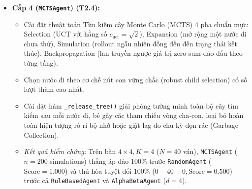 \documentclass[a4paper,12pt]{report}
\begin{document}
\begin{itemize}
\begin{itemize}
        \item Cài đặt cơ chế sắp xếp nước đi (Move Ordering) dựa trên nước đi tối ưu của độ sâu trước (Principal Variation - PV) và ma trận trọng số vị trí tĩnh.
        \item Hàm lượng giá Heuristic tĩnh \texttt{evaluate\_\allowbreak board} lượng giá toàn bộ các cửa sổ thắng mở, chấm điểm theo hàm mũ cơ số 10 và nén phi tuyến qua hàm $\tanh$ vào khoảng $(-1.0, 1.0)$.
        \item Tích hợp cơ chế Iterative Deepening kiểm soát deadline thời gian: kiểm tra đồng hồ mỗi 256 nút duyệt (\texttt{nodes\_\allowbreak visited \& 255 == 0}), chủ động ngắt qua ngoại lệ \texttt{SearchTimeoutError} và lập tức hoàn trả nước đi tốt nhất của độ sâu hoàn chỉnh gần nhất.
        \item \textit{Kết quả kiểm chứng:} Trên bàn $4 \times 4, K=4$ ở độ sâu $d=4$, kỹ thuật cắt tỉa Alpha-Beta kết hợp Move Ordering đã cắt giảm số lượng nút duyệt từ $47{,}297$ nút (Minimax thuần) xuống còn $1{,}941$ nút (giảm tới \textbf{95.9\%} số nút duyệt), độ trễ giảm từ $523.16\text{ ms}$ xuống còn $50.67\text{ ms}$ mà vẫn bảo toàn chính xác nước đi tối ưu và giá trị đánh giá gốc.
    \end{itemize}
    \item \textbf{Cấp 4 (\texttt{MCTSAgent}) (T2.4):}
    \begin{itemize}
        \item Cài đặt thuật toán Tìm kiếm cây Monte Carlo (MCTS) 4 pha chuẩn mực: Selection (UCT với hằng số $c_{\text{uct}} = \sqrt{2}$), Expansion (mở rộng một nước đi chưa thử), Simulation (rollout ngẫu nhiên đồng đều đến trạng thái kết thúc), Backpropagation (lan truyền ngược giá trị zero-sum đảo dấu theo từng tầng).
        \item Chọn nước đi theo cơ chế nút con vững chắc (robust child selection) có số lượt thăm cao nhất.
        \item Cài đặt hàm \texttt{\_release\_\allowbreak tree()} giải phóng tường minh toàn bộ cây tìm kiếm sau mỗi nước đi, bẻ gãy các tham chiếu vòng cha-con, loại bỏ hoàn toàn hiện tượng rò rỉ bộ nhớ hoặc giật lag do chu kỳ dọn rác (Garbage Collection).
        \item \textit{Kết quả kiểm chứng:} Trên bàn $4 \times 4, K=4$ ($N=40$ ván), \texttt{MCTSAgent} ($n=200$ simulations) thắng áp đảo 100\% trước \texttt{RandomAgent} ($\text{Score} = 1.000$) và thủ hòa tuyệt đối 100\% ($0-40-0, \text{Score} = 0.500$) trước cả \texttt{RuleBasedAgent} và \texttt{AlphaBetaAgent} ($d=4$).

\end{itemize}
\end{itemize}
\end{document}
